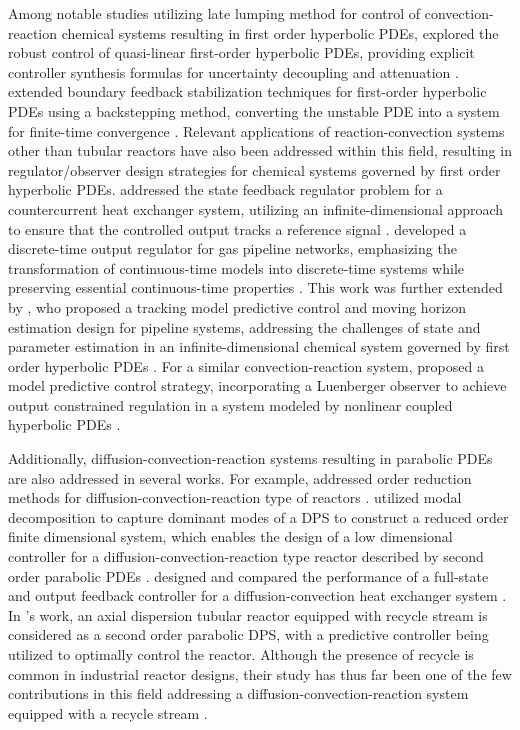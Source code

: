 Among notable studies utilizing late lumping method for control of convection-reaction chemical systems resulting in first order hyperbolic PDEs,  explored the robust control of quasi-linear first-order hyperbolic PDEs, providing explicit controller synthesis formulas for uncertainty decoupling and attenuation \autocite{christofides1998robust}.  extended boundary feedback stabilization techniques for first-order hyperbolic PDEs using a backstepping method, converting the unstable PDE into a system for finite-time convergence \autocite{krstic2008backstepping}. Relevant applications of reaction-convection systems other than tubular reactors have also been addressed within this field, resulting in regulator/observer design strategies for chemical systems governed by first order hyperbolic PDEs.  addressed the state feedback regulator problem for a countercurrent heat exchanger system, utilizing an infinite-dimensional approach to ensure that the controlled output tracks a reference signal \autocite{xu2016state}.  developed a discrete-time output regulator for gas pipeline networks, emphasizing the transformation of continuous-time models into discrete-time systems while preserving essential continuous-time properties \autocite{xie2021discrete}. This work was further extended by , who proposed a tracking model predictive control and moving horizon estimation design for pipeline systems, addressing the challenges of state and parameter estimation in an infinite-dimensional chemical system governed by first order hyperbolic PDEs \autocite{zhang2023tracking}. For a similar convection-reaction system,  proposed a model predictive control strategy, incorporating a Luenberger observer to achieve output constrained regulation in a system modeled by nonlinear coupled hyperbolic PDEs \autocite{zhang2022dynamic}. 

Additionally, diffusion-convection-reaction systems resulting in parabolic PDEs are also addressed in several works. For example,  addressed order reduction methods for diffusion-convection-reaction type of reactors \autocite{Christofides2012book}.  utilized modal decomposition to capture dominant modes of a DPS to construct a reduced order finite dimensional system, which enables the design of a low dimensional controller for a diffusion-convection-reaction type reactor described by second order parabolic PDEs \autocite{dubljevic2006predictive2}.  designed and compared the performance of a full-state and output feedback controller for a diffusion-convection heat exchanger system \autocite{ozorio2019heat}. In 's work, an axial dispersion tubular reactor equipped with recycle stream is considered as a second order parabolic DPS, with a predictive controller being utilized to optimally control the reactor.  Although the presence of recycle is common in industrial reactor designs, their study has thus far been one of the few contributions in this field addressing a diffusion-convection-reaction system equipped with a recycle stream \autocite{khatibi2021model}.


